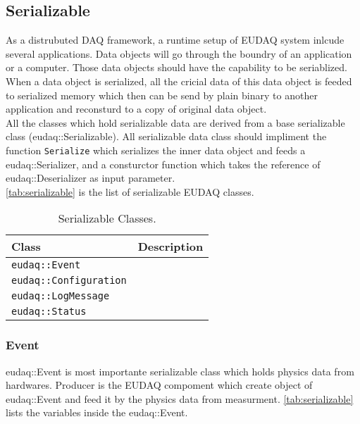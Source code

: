 \subsection{Serializable}
As a distrubuted DAQ framework, a runtime setup of EUDAQ system inlcude several applications. Data objects will go through the boundry of an application or a computer. Those data objects should have the capability to be seriablized. When a data object is serialized, all the cricial data of this data object is feeded to serialized memory which then can be send by plain binary to another application and reconsturd to a copy of original data object. \\

All the classes which hold serializable data are derived from a base serializable class (eudaq::Serializable). All serializable data class
should impliment the function \texttt{Serialize} which serializes the inner data object and feeds a eudaq::Serializer, and a consturctor function which takes the reference of eudaq::Deserializer as input parameter.\\

\autoref{tab:serializable} is the list of serializable EUDAQ classes.

\begin{table}
\centering
\small
\begin{tabular}{ l | l }
  \textbf{Class} & \textbf{Description}\\
  \hline
  \texttt{eudaq::Event} & \\
  \texttt{eudaq::Configuration} & \\
  \texttt{eudaq::LogMessage} & \\
  \texttt{eudaq::Status} &  \\
\end{tabular}
\caption{Serializable Classes.}
\label{tab:serializable}
\end{table}

\subsubsection{Event}
eudaq::Event is most importante serializable class which holds physics data from hardwares. Producer is the EUDAQ compoment which create object of eudaq::Event and feed it by the physics data from measurment.  \autoref{tab:serializable} lists the variables inside the eudaq::Event. \\

